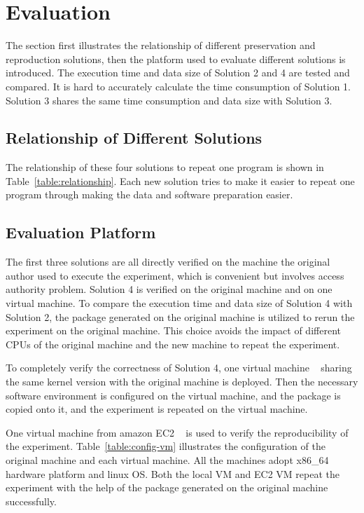 \documentclass{acm_proc_article-sp}
\begin{document}
\section{Evaluation}
The section first illustrates the relationship of different preservation and reproduction solutions, then the platform used to evaluate different solutions is introduced. The execution time and data size of Solution 2 and 4 are tested and compared. It is hard to accurately calculate the time consumption of Solution 1. Solution 3 shares the same time consumption and data size with Solution 3.

\subsection{Relationship of Different Solutions}
The relationship of these four solutions to repeat one program is shown in Table~\ref{table:relationship}. Each new solution tries to make it easier to repeat one program through making the data and software preparation easier.

\subsection{Evaluation Platform}

The first three solutions are all directly verified on the machine the original
author used to execute the experiment, which is convenient but involves access
authority problem. Solution 4 is verified on the original machine and on one virtual machine.
To compare the execution time and data size of Solution 4
with Solution 2, the package generated on the original machine is utilized to
rerun the experiment on the original machine. This choice avoids the impact of
different CPUs of the original machine and the new machine to repeat the
experiment. 

To completely verify the correctness of Solution 4, one virtual
machine ~\cite{goldberg1974survey} sharing the same kernel version with the original machine is deployed.
Then the necessary software environment is configured on the virtual machine,
and the package is copied onto it, and the
experiment is repeated on the virtual machine.

One virtual machine from amazon EC2 ~\cite{amazon2010amazon} is used to verify the reproducibility of the experiment. Table~\ref{table:config-vm} illustrates the configuration of the original machine and each virtual machine. 
All the machines adopt x86\_64 hardware platform and linux OS.
Both the local VM and EC2 VM repeat the experiment with the help of the package generated on the original machine successfully.
\end{document}
